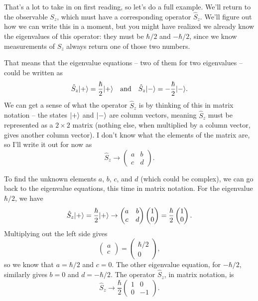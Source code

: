 That's a lot to take in on first reading, so let's do a full example.  We'll return to the observable $S_z$, which must have a corresponding operator $\hat{S}_z$.  We'll figure out how we can write this in a moment, but you might have realized we already know the eigenvalues of this operator: they must be $\hbar/2$ and $-\hbar/2$, since we know measurements of $S_z$ always return one of those two numbers.

That means that the eigenvalue equations -- two of them for two eigenvalues -- could be written as
\begin{equation}
\hat{S}_z | + \rangle = \frac{\hbar}{2} | + \rangle \quad \text{and} \quad \hat{S}_z | - \rangle = -\frac{\hbar}{2} | - \rangle.
\end{equation}
We can get a sense of what the operator $\hat{S}_z$ is by thinking of this in matrix notation -- the states $| + \rangle$ and $| - \rangle$ are column vectors, meaning $\hat{S}_z$ must be represented as a $2\times 2$ matrix (nothing else, when multiplied by a column vector, gives another column vector).  I don't know what the elements of the matrix are, so I'll write it out for now as
\[
\hat{S}_z \to \begin{pmatrix} a & b \\ c & d \end{pmatrix}.
\]

To find the unknown elements $a$, $b$, $c$, and $d$ (which could be complex), we can go back to the eigenvalue equations, this time in matrix notation.  For the eigenvalue $\hbar/2$, we have
\begin{equation}
\hat{S}_z | + \rangle = \frac{\hbar}{2} | + \rangle \to \begin{pmatrix} a & b \\ c & d \end{pmatrix} \begin{pmatrix} 1 \\ 0 \end{pmatrix} = \frac{\hbar}{2} \begin{pmatrix} 1 \\ 0 \end{pmatrix}.
\end{equation}
Multiplying out the left side gives
\[
\begin{pmatrix} a \\ c \end{pmatrix} = \begin{pmatrix} \hbar/2 \\ 0 \end{pmatrix},
\]
so we know that $a = \hbar/2$ and $c = 0$.  The other eigenvalue equation, for $-\hbar/2$, similarly gives $b = 0$ and $d = -\hbar/2$.  The operator $\hat{S}_z$, in matrix notation, is
\begin{equation}
\label{eq_sz_matrix}
\hat{S}_z \to \frac{\hbar}{2} \begin{pmatrix} 1 & 0 \\ 0 & -1 \end{pmatrix}.
\end{equation}

